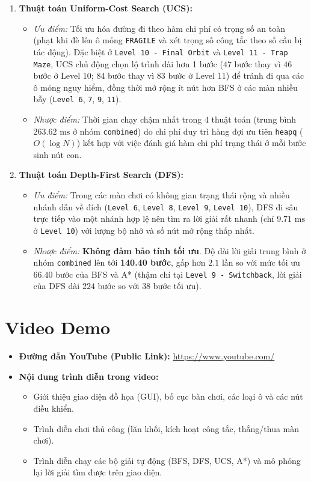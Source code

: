 \documentclass[12pt,a4paper]{article}
\begin{document}
\begin{enumerate}
\begin{itemize}
    \end{itemize}
    \item \textbf{Thuật toán Uniform-Cost Search (UCS):}
    \begin{itemize}
        \item \emph{Ưu điểm:} Tối ưu hóa đường đi theo hàm chi phí có trọng số an toàn (phạt khi đè lên ô mỏng \texttt{FRAGILE} và xét trọng số công tắc theo số cầu bị tác động). Đặc biệt ở \texttt{Level 10 - Final Orbit} và \texttt{Level 11 - Trap Maze}, UCS chủ động chọn lộ trình dài hơn 1 bước ($47$ bước thay vì $46$ bước ở Level 10; $84$ bước thay vì $83$ bước ở Level 11) để tránh đi qua các ô mỏng nguy hiểm, đồng thời mở rộng ít nút hơn BFS ở các màn nhiều bẫy (\texttt{Level 6}, \texttt{7}, \texttt{9}, \texttt{11}).
        \item \emph{Nhược điểm:} Thời gian chạy chậm nhất trong 4 thuật toán (trung bình $263.62\text{ ms}$ ở nhóm \texttt{combined}) do chi phí duy trì hàng đợi ưu tiên \texttt{heapq} ($O(\log N)$) kết hợp với việc đánh giá hàm chi phí trạng thái ở mỗi bước sinh nút con.
    \end{itemize}
    \item \textbf{Thuật toán Depth-First Search (DFS):}
    \begin{itemize}
        \item \emph{Ưu điểm:} Trong các màn chơi có không gian trạng thái rộng và nhiều nhánh dẫn về đích (\texttt{Level 6}, \texttt{Level 8}, \texttt{Level 9}, \texttt{Level 10}), DFS đi sâu trực tiếp vào một nhánh hợp lệ nên tìm ra lời giải rất nhanh (chỉ $9.71\text{ ms}$ ở \texttt{Level 10}) với lượng bộ nhớ và số nút mở rộng thấp nhất.
        \item \emph{Nhược điểm:} \textbf{Không đảm bảo tính tối ưu}. Độ dài lời giải trung bình ở nhóm \texttt{combined} lên tới \textbf{140.40 bước}, gấp hơn $2.1$ lần so với mức tối ưu $66.40$ bước của BFS và A* (thậm chí tại \texttt{Level 9 - Switchback}, lời giải của DFS dài $224$ bước so với $38$ bước tối ưu).
    \end{itemize}
\end{enumerate}

\section{Video Demo}
\begin{itemize}
    \item \textbf{Đường dẫn YouTube (Public Link):} \url{https://www.youtube.com/}
    \item \textbf{Nội dung trình diễn trong video:}
    \begin{itemize}
        \item Giới thiệu giao diện đồ họa (GUI), bố cục bàn chơi, các loại ô và các nút điều khiển.
        \item Trình diễn chơi thủ công (lăn khối, kích hoạt công tắc, thắng/thua màn chơi).
        \item Trình diễn chạy các bộ giải tự động (BFS, DFS, UCS, A*) và mô phỏng lại lời giải tìm được trên giao diện.
    \end{itemize}
\end{itemize}
\end{document}
